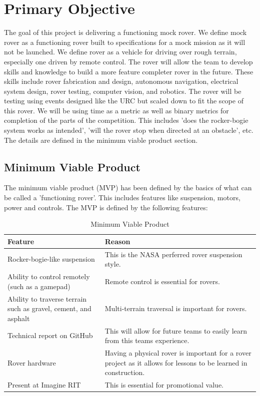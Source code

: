 \documentclass[conference]{IEEEtran} %
\begin{document}
\section{Primary Objective}
\label{sec:primary-obj}
The goal of this project is delivering a functioning mock rover.
We define mock rover as a functioning rover built to specifications
for a mock mission as it will not be launched. 
We define rover as a vehicle for driving over rough terrain, especially one driven by remote control.
The rover will allow the team to develop skills and knowledge to build a
more feature completer rover in the future. 
These skills include rover fabrication and design, autonomous navigation, electrical system design, rover testing, computer vision, and robotics.
The rover will be testing using events designed like the URC but scaled down to fit the scope of this rover. 
We will be using time as a metric as well as binary metrics for completion of the parts of the competition. 
This includes ’does the rocker-bogie system works as intended’, ’will the rover stop when directed at an obstacle’, etc. 
The details are defined in the minimum viable product section.

\subsection{Minimum Viable Product}
The minimum viable product (MVP) has been defined by the basics of what can be called a 'functioning rover'. This includes features like suspension, motors, power and controls. The MVP is defined by the following features: 

\begin{table}[hb!]
    \caption{Minimum Viable Product}
    \centering
    {\renewcommand{\arraystretch}{1.5}
    \begin{tabularx}{\linewidth}{LL} 
    \hline
    \textbf{Feature} & \textbf{Reason} \\
    \hline
    Rocker-bogie-like suspension & This is the NASA perferred rover suspension style. \\
    Ability to control remotely (such as a gamepad) & Remote control is essential for rovers. \\
    Ability to traverse terrain such as gravel, cement, and asphalt & Multi-terrain traversal is important for rovers. \\
    Technical report on GitHub & This will allow for future teams to easily learn from this teams experience. \\
    Rover hardware & Having a physical rover is important for a rover project as it allows for lessons to be learned in construction. \\ 
    Present at Imagine RIT & This is essential for promotional value. \\
    \hline
    \end{tabularx}
    }
\label{tab:mvp-one}
\end{table}
\end{document}
